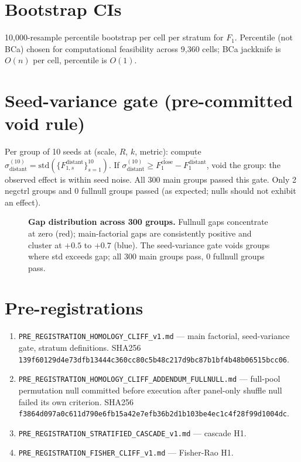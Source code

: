 \documentclass[11pt]{article}
\begin{document}
\section{Bootstrap CIs}
10{,}000-resample percentile bootstrap per cell per stratum for $F_1$. Percentile (not BCa) chosen for computational feasibility across 9{,}360 cells; BCa jackknife is $O(n)$ per cell, percentile is $O(1)$.

\section{Seed-variance gate (pre-committed void rule)}
Per group of 10 seeds at (scale, $R$, $k$, metric): compute $\sigma^{(10)}_{\text{distant}} = \text{std}(\{F_{1,s}^{\text{distant}}\}_{s=1}^{10})$. If $\sigma^{(10)}_{\text{distant}} \ge \overline{F_1^{\text{close}}} - \overline{F_1^{\text{distant}}}$, void the group: the observed effect is within seed noise. All 300 main groups passed this gate. Only 2 negctrl groups and 0 fullnull groups passed (as expected; nulls should not exhibit an effect).

\begin{figure}[h]\centering
{}
\caption{\textbf{Gap distribution across 300 groups.} Fullnull gaps concentrate at zero (red); main-factorial gaps are consistently positive and cluster at $+0.5$ to $+0.7$ (blue). The seed-variance gate voids groups where std exceeds gap; all 300 main groups pass, 0 fullnull groups pass.}\label{fig:gap_dist}
\end{figure}

\section{Pre-registrations}
\begin{enumerate}
\item \texttt{PRE\_REGISTRATION\_HOMOLOGY\_CLIFF\_v1.md} — main factorial, seed-variance gate, stratum definitions. SHA256 \texttt{139f60129d4e73dfb13444c360cc80c5b48c217d9bc87b1bf4b48b06515bcc06}.
\item \texttt{PRE\_REGISTRATION\_HOMOLOGY\_CLIFF\_ADDENDUM\_FULLNULL.md} — full-pool permutation null committed before execution after panel-only shuffle null failed its own criterion. SHA256 \texttt{f3864d097a0c611d790e6fb15a42e7efb36b2d1b103be4ec1c4f28f99d1004dc}.
\item \texttt{PRE\_REGISTRATION\_STRATIFIED\_CASCADE\_v1.md} — cascade H1.
\item \texttt{PRE\_REGISTRATION\_FISHER\_CLIFF\_v1.md} — Fisher-Rao H1.
\end{enumerate}
\end{document}
